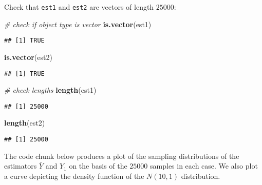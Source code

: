 \documentclass[]{book}
\newenvironment{Shaded}{\begin{snugshade}}{\end{snugshade}}
\newcommand{\KeywordTok}[1]{\textcolor[rgb]{0.13,0.29,0.53}{\textbf{#1}}}
\newcommand{\CommentTok}[1]{\textcolor[rgb]{0.56,0.35,0.01}{\textit{#1}}}
\newcommand{\NormalTok}[1]{#1}
\theoremstyle{definition}
\theoremstyle{definition}
\theoremstyle{definition}
\theoremstyle{remark}
\begin{document}
Check that \texttt{est1} and \texttt{est2} are vectors of length
\(25000\):

\begin{Shaded}
\begin{Highlighting}[]
\CommentTok{# check if object type is vector}
\KeywordTok{is.vector}\NormalTok{(est1)}
\end{Highlighting}
\end{Shaded}

\begin{verbatim}
## [1] TRUE
\end{verbatim}

\begin{Shaded}
\begin{Highlighting}[]
\KeywordTok{is.vector}\NormalTok{(est2)}
\end{Highlighting}
\end{Shaded}

\begin{verbatim}
## [1] TRUE
\end{verbatim}

\begin{Shaded}
\begin{Highlighting}[]
\CommentTok{# check lengths}
\KeywordTok{length}\NormalTok{(est1)}
\end{Highlighting}
\end{Shaded}

\begin{verbatim}
## [1] 25000
\end{verbatim}

\begin{Shaded}
\begin{Highlighting}[]
\KeywordTok{length}\NormalTok{(est2)}
\end{Highlighting}
\end{Shaded}

\begin{verbatim}
## [1] 25000
\end{verbatim}

The code chunk below produces a plot of the sampling distributions of
the estimators \(\bar{Y}\) and \(Y_1\) on the basis of the \(25000\)
samples in each case. We also plot a curve depicting the density
function of the \(N(10,1)\) distribution.
\end{document}
